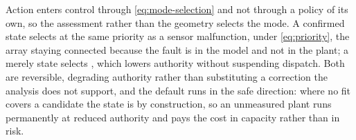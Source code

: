 Action enters control through \autoref{eq:mode-selection} and not through a policy of its own, so the assessment rather than the geometry selects the mode. A confirmed  state selects  at the same priority as a sensor malfunction, under \autoref{eq:priority}, the array staying connected because the fault is in the model and not in the plant; a merely  state selects , which lowers authority without suspending dispatch. Both are reversible, degrading authority rather than substituting a correction the analysis does not support, and the default runs in the safe direction: where no fit covers a candidate the state is  by construction, so an unmeasured plant runs permanently at reduced authority and pays the cost in capacity rather than in risk.
